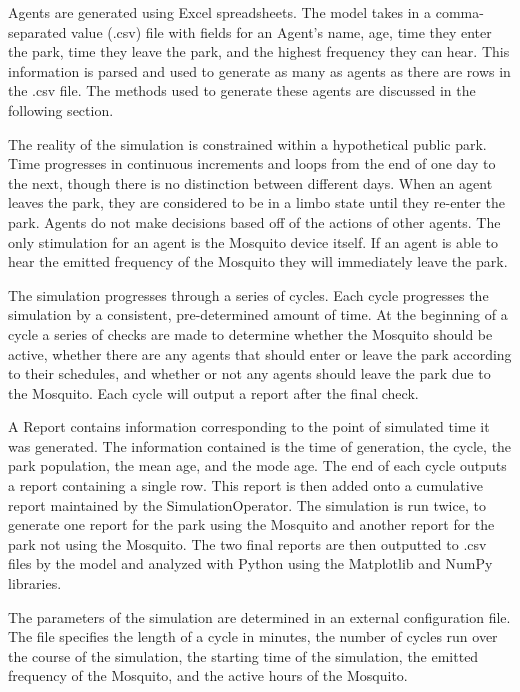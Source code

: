 \documentclass[twocolumn,11pt]{article}
\begin{document}
Agents are generated using Excel spreadsheets. The model takes in a comma-separated value (.csv) file with fields for an Agent's name, age, time they enter the park, time they leave the park, and the highest frequency they can hear. This information is parsed and used to generate as many as agents as there are rows in the .csv file. The methods used to generate these agents are discussed in the following section.

The reality of the simulation is constrained within a hypothetical public park. Time progresses in continuous increments and loops from the end of one day to the next, though there is no distinction between different days. When an agent leaves the park, they are considered to be in a limbo state until they re-enter the park. Agents do not make decisions based off of the actions of other agents. The only stimulation for an agent is the Mosquito device itself. If an agent is able to hear the emitted frequency of the Mosquito they will immediately leave the park.

The simulation progresses through a series of cycles. Each cycle progresses the simulation by a consistent, pre-determined amount of time. At the beginning of a cycle a series of checks are made to determine whether the Mosquito should be active, whether there are any agents that should enter or leave the park according to their schedules, and whether or not any agents should leave the park due to the Mosquito. Each cycle will output a report after the final check.

A Report contains information corresponding to the point of simulated time it was generated. The information contained is the time of generation, the cycle, the park population, the mean age, and the mode age. The end of each cycle outputs a report containing a single row. This report is then added onto a cumulative report maintained by the SimulationOperator. The simulation is run twice, to generate one report for the park using the Mosquito and another report for the park not using the Mosquito. The two final reports are then outputted to .csv files by the model and analyzed with Python using the Matplotlib and NumPy libraries.

The parameters of the simulation are determined in an external configuration file. The file specifies the length of a cycle in minutes, the number of cycles run over the course of the simulation, the starting time of the simulation, the emitted frequency of the Mosquito, and the active hours of the Mosquito.
\end{document}
